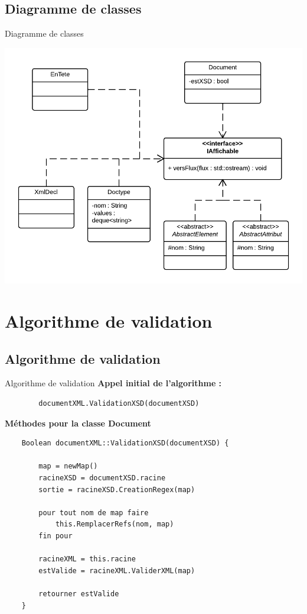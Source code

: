 \documentclass[aspectratio=169]{beamer}
\begin{document}
\subsection{Diagramme de classes}
\begin{frame}{Diagramme de classes}
\begin{center}
  \includegraphics[scale=0.3]{ddc_iaff}
\end{center}
\end{frame}


\section{Algorithme de  validation}
\subsection{Algorithme de  validation}
\begin{frame}[fragile]{Algorithme de validation}
	\textbf{Appel initial de l'algorithme :}
	\scriptsize
	\begin{verbatim}
		documentXML.ValidationXSD(documentXSD)
	\end{verbatim}

	\normalsize
	\textbf{Méthodes pour la classe Document}
	\scriptsize
	\begin{verbatim}
	Boolean documentXML::ValidationXSD(documentXSD) {

	    map = newMap()
	    racineXSD = documentXSD.racine
	    sortie = racineXSD.CreationRegex(map)

	    pour tout nom de map faire
	        this.RemplacerRefs(nom, map)
	    fin pour

	    racineXML = this.racine
	    estValide = racineXML.ValiderXML(map)
	
	    retourner estValide
	}

	\end{verbatim}
\end{frame}
\end{document}
